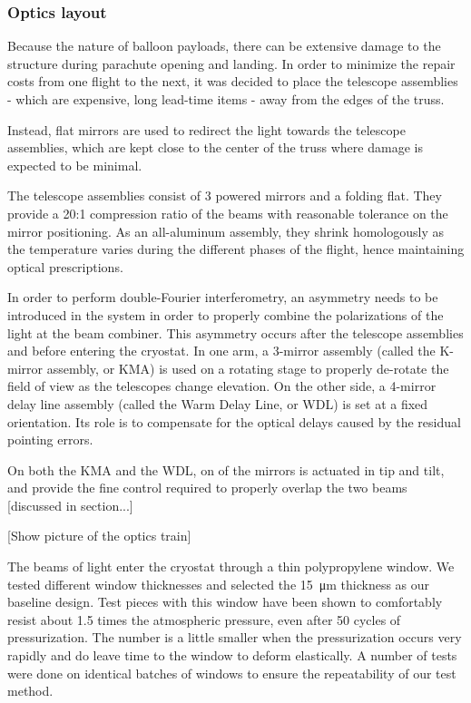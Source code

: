 \subsubsection{Optics layout}
Because the nature of balloon payloads, there can be extensive damage to the structure during parachute opening and landing. In order to minimize the repair costs from one flight to the next, it was decided to place the telescope assemblies - which are expensive, long lead-time items - away from the edges of the truss. 

Instead, flat mirrors are used to redirect the light towards the telescope assemblies, which are kept close to the center of the truss where damage is expected to be minimal. 

The telescope assemblies consist of 3 powered mirrors and a folding flat. They provide a 20:1 compression ratio of the beams with reasonable tolerance on the mirror positioning. As an all-aluminum assembly, they shrink homologously as the temperature varies during the different phases of the flight, hence maintaining optical prescriptions. 

In order to perform double-Fourier interferometry, an asymmetry needs to be introduced in the system in order to properly combine the polarizations of the light at the beam combiner. This asymmetry occurs after the telescope assemblies and before entering the cryostat. In one arm, a 3-mirror assembly (called the K-mirror assembly, or KMA) is used on a rotating stage to properly de-rotate the field of view as the telescopes change elevation. On the other side, a 4-mirror delay line assembly (called the Warm Delay Line, or WDL) is set at a fixed orientation. Its role is to compensate for the optical delays caused by the residual pointing errors. 

On both the KMA and the WDL, on of the mirrors is actuated in tip and tilt, and provide the fine control required to properly overlap the two beams [discussed in section...]

[Show picture of the optics train]

The beams of light enter the cryostat through a thin polypropylene window. We tested different window thicknesses and selected the \SI{15}{\micro\meter} thickness as our baseline design. Test pieces with this window have been shown to comfortably resist about 1.5 times the atmospheric pressure, even after 50 cycles of pressurization. The number is a little smaller when the pressurization occurs very rapidly and do leave time to the window to deform elastically. A number of tests were done on identical batches of windows to ensure the repeatability of our test method. 




